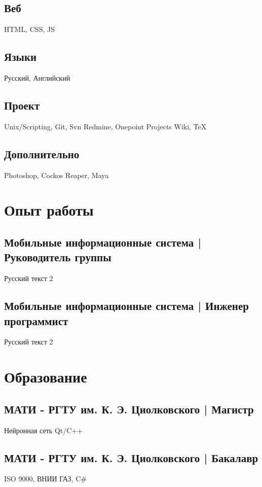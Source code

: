 \documentclass[a4paper]{curricula-vitae}
\begin{document}
\begin{minipage}[t]{0.33\textwidth}
\subsection{Веб}
HTML, CSS, JS

\subsection{Языки}
Русский, Английский

\subsection{Проект}
Unix/Scripting, Git, Svn
Redmine, Onepoint Projects
Wiki, TeX

\subsection{Дополнительно}
Photoshop, 
Cockos Reaper, 
Maya

\end{minipage} %
\hfill
\begin{minipage}[t]{0.66\textwidth} %

\section{Опыт работы} 

\subsection{Мобильные информационные система | Руководитель группы}
Русский текст 2

\subsection{Мобильные информационные система | Инженер программист}
Русский текст 2

\section{Образование} 

\subsection{МАТИ - РГТУ им. К. Э. Циолковского | Магистр}
Нейронная сеть Qt/C++

\subsection{МАТИ - РГТУ им. К. Э. Циолковского | Бакалавр}
ISO 9000, ВНИИ ГАЗ, C#

\end{minipage} %

\end{document}
